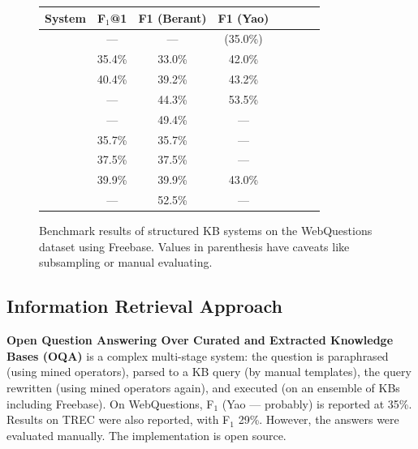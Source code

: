 \begin{figure}[t]
\centering
\begin{tabular}{|c|ccc|cccc|}
\hline
System & F$_1$@1 & F1 (Berant) & F1 (Yao) \\ \hline
\cite{OQA} &
---              & ---         & (35.0\%) \\
\cite{TreeFreebase2014Yao} &
35.4\%           & 33.0\%      & 42.0\%   \\
\cite{Semantic2014Bordes} &
40.4\%           & 39.2\%      & 43.2\%   \\
\cite{LeanFreebaseYao} &
---              & 44.3\%      & 53.5\%   \\
\cite{Aqqu} &
---              & 49.4\%      & ---      \\
\hline
\cite{Semantic2013Berant} &
35.7\%           & 35.7\%      & ---      \\
\cite{MTBao2014} &
37.5\%           & 37.5\%      & ---      \\
\cite{SPBerant2014Paraphrase} &
39.9\%           & 39.9\%      & 43.0\%   \\
\cite{STAGG} &
---              & 52.5\%      & ---      \\
\hline
\end{tabular}
\vspace*{-0.2cm}
\caption{Benchmark results of structured KB systems on the WebQuestions dataset using Freebase.
Values in parenthesis have caveats like subsampling or manual evaluating.}
\label{fig:structcompare}
\end{figure}

\subsection{Information Retrieval Approach}

\textbf{Open Question Answering Over Curated and Extracted Knowledge Bases (OQA)} \citep{OQA}
	is a complex multi-stage system:
	the question is paraphrased (using mined operators),
	parsed to a KB query (by manual templates),
	the query rewritten (using mined operators again),
	and executed (on an ensemble of KBs including Freebase).
	On WebQuestions, F$_1$ (Yao --- probably) is reported at 35\%.
	Results on TREC were also reported, with F$_1$ 29\%.
	However, the answers were evaluated manually.
	The implementation is open source.


